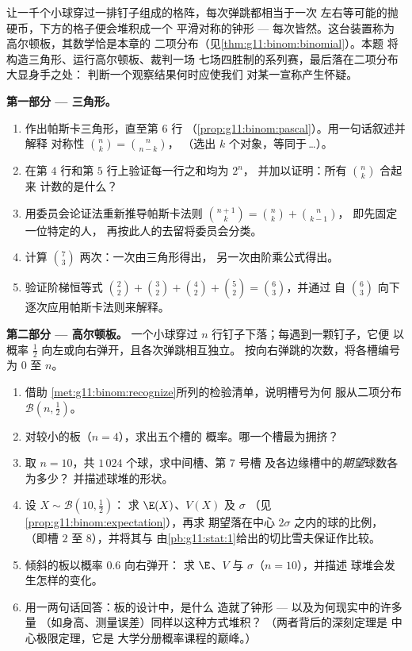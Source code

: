 \begin{problem}
\label{pb:g11:binom:1}
让一千个小球穿过一排钉子组成的格阵，每次弹跳都相当于一次
左右等可能的抛硬币，下方的格子便会堆积成一个
平滑对称的钟形 --- 每次皆然。这台装置称为
高尔顿板，其数学恰是本章的
二项分布（见\cref{thm:g11:binom:binomial}）。本题
将构造三角形、运行高尔顿板、裁判一场
七场四胜制的系列赛，最后落在二项分布大显身手之处：
判断一个观察结果何时应使我们
对某一宣称产生怀疑。

\medskip
\noindent\textbf{第一部分 --- 三角形。}
\begin{enumerate}
  \item 作出帕斯卡三角形，直至第 $6$ 行
        （\cref{prop:g11:binom:pascal}）。用一句话叙述并解释
        对称性 $\binom nk = \binom{n}{n-k}$，
        （选出 $k$ 个对象，等同于\,\dots）。
  \item 在第 $4$ 行和第 $5$ 行上验证每一行之和均为 $2^n$，
        并加以证明：所有 $\binom nk$ 合起来
        计数的是什么？
  \item 用委员会论证法重新推导帕斯卡法则
        $\binom{n+1}{k} = \binom nk + \binom{n}{k-1}$，
        即先固定一位特定的人，
        再按此人的去留将委员会分类。
  \item 计算 $\binom73$ 两次：一次由三角形得出，
        另一次由阶乘公式得出。
  \item 验证阶梯恒等式
        $\binom22 + \binom32 + \binom42 + \binom52 =
        \binom63$，并通过
        自 $\binom63$ 向下逐次应用帕斯卡法则来解释。
\end{enumerate}

\medskip
\noindent\textbf{第二部分 --- 高尔顿板。}
一个小球穿过 $n$ 行钉子下落；每遇到一颗钉子，它便
以概率 $\frac12$ 向左或向右弹开，且各次弹跳相互独立。
按向右弹跳的次数，将各槽编号为 $0$ 至 $n$。
\begin{enumerate}[resume]
  \item 借助
        \cref{met:g11:binom:recognize}所列的检验清单，说明槽号为何
        服从二项分布
        $\mathcal B\!\left(n, \frac12\right)$。
  \item 对较小的板（$n = 4$），求出五个槽的
        概率。哪一个槽最为拥挤？
  \item 取 $n = 10$，共 $1\,024$ 个球，求中间槽、第 $7$ 号槽
        及各边缘槽中的\emph{期望}球数各为多少？
        并描述球堆的形状。
  \item 设 $X \sim \mathcal B\!\left(10, \frac12\right)$：
        求 $\E(X)$、$V(X)$ 及 $\sigma$
        （见\cref{prop:g11:binom:expectation}），再求
        期望落在中心 $2\sigma$ 之内的球的比例，
        （即槽 $2$ 至 $8$），并将其与
        由\cref{pb:g11:stat:1}给出的切比雪夫保证作比较。
  \item 倾斜的板以概率 $0.6$ 向右弹开：
        求 $\E$、$V$ 与 $\sigma$（$n = 10$），并描述
        球堆会发生怎样的变化。
  \item 用一两句话回答：板的设计中，是什么
        造就了钟形 --- 以及为何现实中的许多量
        （如身高、测量误差）同样以这种方式堆积？
        （两者背后的深刻定理是
        中心极限定理，它是
        大学分册概率课程的巅峰。）
\end{enumerate}


\end{problem}
